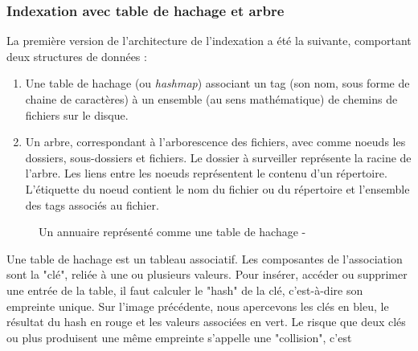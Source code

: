 \documentclass[a4paper, 12pt]{article}
\begin{document}
\subsubsection{Indexation avec table de hachage et arbre}
La première version de l'architecture de l'indexation a été la suivante, comportant deux structures 
de données :
\begin{enumerate}
    \item Une table de hachage (ou \textit{hashmap}) associant un tag (son nom, sous forme de 
        chaine de caractères) à un ensemble (au sens mathématique) de chemins de fichiers sur 
        le disque.
    \item Un arbre, correspondant à l'arborescence des fichiers, avec comme noeuds les dossiers, 
        sous-dossiers et fichiers. Le dossier à surveiller représente la racine de l'arbre.
        Les liens entre les noeuds représentent le contenu d'un répertoire. L'étiquette du noeud 
        contient le nom du fichier ou du répertoire et l'ensemble des tags associés au fichier.
\end{enumerate}
\begin{figure}
    \begin{center}
    \end{center}
    \caption{Un annuaire représenté comme une table de hachage - \cite{ref27}}
\end{figure}
Une table de hachage est un tableau associatif. Les composantes de l'association sont la "clé", 
reliée à une ou plusieurs valeurs. Pour insérer, accéder ou supprimer une entrée de la table, 
il faut calculer le "hash" de la clé, c'est-à-dire son empreinte unique. Sur l'image précédente, 
nous apercevons les clés en bleu, le résultat du hash en rouge et les valeurs associées en vert. 
Le risque que deux clés ou plus produisent une même empreinte s'appelle une "collision", c'est 
\end{document}
